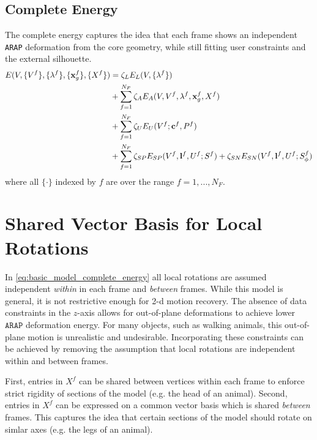 \documentclass[a4paper,10pt]{article}
\newcommand{\mb}{\mathbf}
\begin{document}
\subsection{Complete Energy}
The complete energy captures the idea that each frame shows an independent \texttt{ARAP} deformation from the core geometry, while still fitting user constraints and the external silhouette.
\begin{align}
\label{eq:basic_model_complete_energy}
E(V, \{V^f\}, \{\lambda^f\}, \{\mb{x}^f_g\}, \{X^f\}) &= \zeta_{L} E_{L}(V, \{\lambda^f\}) \notag\\
&+ \sum_{f=1}^{N_F} \zeta_{A} E_{A}(V, V^f, \lambda^f, \mb{x}^f_g, X^f) \notag\\
&+ \sum_{f=1}^{N_F} \zeta_{U} E_{U}(V^f ; \mb{c}^f, P^f) \notag \\
&+ \sum_{f=1}^{N_F} \zeta_{SP} E_{SP}(V^f, \mb{l}^f, U^f ; S^f)  + \zeta_{SN} E_{SN}(V^f, \mb{l}^f, U^f ; S_\phi^f)
\end{align}
where all $\{\cdot\}$ indexed by $f$ are over the range $f = 1, ..., N_F$.

\section{Shared Vector Basis for Local Rotations}
In \eqref{eq:basic_model_complete_energy} all local rotations are assumed independent \emph{within} in each frame and \emph{between} frames.
While this model is general, it is not restrictive enough for 2-d motion recovery.
The absence of data constraints in the $z$-axis allows for out-of-plane deformations to achieve lower $\texttt{ARAP}$ deformation energy.
For many objects, such as walking animals, this out-of-plane motion is unrealistic and undesirable.
Incorporating these constraints can be achieved by removing the assumption that local rotations are independent within and between frames.

First, entries in $X^f$ can be shared between vertices within each frame to enforce strict rigidity of sections of the model (e.g. the head of an animal).
Second, entries in $X^f$ can be expressed on a common vector basis which is shared \emph{between} frames.
This captures the idea that certain sections of the model should rotate on simlar axes (e.g. the legs of an animal).
\end{document}
